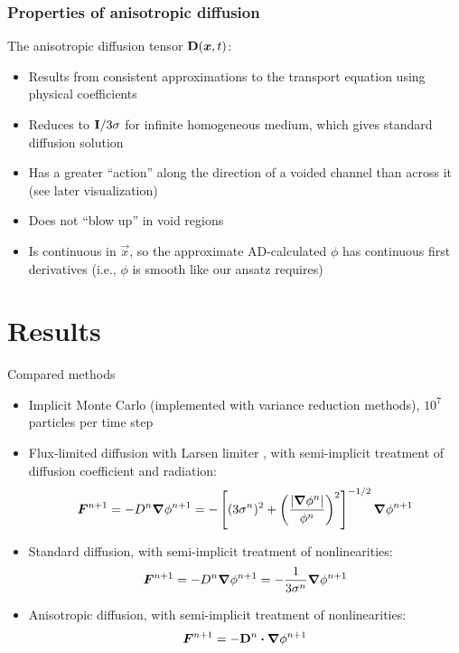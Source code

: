\documentclass{beamer}
\begin{document}
\begin{frame}
  \frametitle{Properties of anisotropic diffusion}

  The anisotropic diffusion tensor $\mathbf{D}(\bm{x},t)$: 
  \begin{itemize}
    \item Results from consistent approximations to the transport equation
      using physical coefficients
    \item Reduces to $\mathbf{I}/3\sigma$ for infinite homogeneous
      medium, which gives standard diffusion solution
    \item Has a greater ``action'' along the direction of a voided channel than
      across it (see later visualization)
    \item Does not ``blow up'' in void regions
    \item Is continuous in $\vec{x}$, so the approximate AD-calculated $\phi$
      has continuous first derivatives (i.e., $\phi$ is smooth like our ansatz
      requires)
  \end{itemize}
\end{frame}

\section{Results}
\begin{frame}{Compared methods}
\begin{itemize}
  \item Implicit Monte Carlo \cite{Fle1971} (implemented with variance
    reduction methods), $10^7$ particles per time step
  \item Flux-limited diffusion with Larsen limiter \cite{Ols2000}, with
    semi-implicit treatment of diffusion coefficient and radiation:
    \begin{equation*}
      \bm{F}^{n+1} = - D^{n} \bm{\nabla} \phi^{n+1}  = -\left[ (3\sigma^{n})^2
      + \left( \frac{\left| \bm{\nabla} \phi^{n} \right|}{\phi^{n}}  \right)^2 \right]^{-1/2}
      \bm{\nabla} \phi^{n+1}
    \end{equation*}
  \item Standard diffusion, with semi-implicit treatment of nonlinearities:
    \begin{equation*}
      \bm{F}^{n+1} = - D^{n} \bm{\nabla} \phi^{n+1} 
      = -\frac{1}{3\sigma^{n}} \bm{\nabla} \phi^{n+1}
    \end{equation*}
  \item Anisotropic diffusion, with semi-implicit treatment of nonlinearities:
    \begin{equation*}
      \bm{F}^{n+1} = -\mathbf{D}^{n}\bm{\cdot} \bm{\nabla} \phi^{n+1} 
    \end{equation*}
\end{itemize}
\end{frame}
\end{document}
